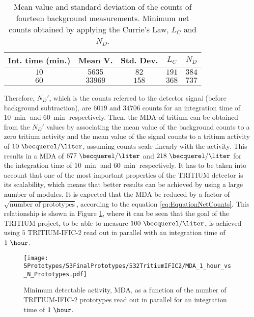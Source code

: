 \begin{table}[htbp]
\centering{}%
\begin{tabular}{ccccc}
\toprule 
Int. time (min.) & Mean V. & Std. Dev. & $L_C$ & $N_D$ \tabularnewline
\midrule
\midrule 
$10$ & $5635$ & $82$ & $191$ & $384$ \tabularnewline
$60$ & $33969$ & $158$ & $368$ & $737$ \tabularnewline
\bottomrule
\end{tabular}
\caption{Mean value and standard deviation of the counts of fourteen background measurements. Minimum net counts obtained by applying the Currie's Law, $L_C$ and $N_D$.}
\label{tab:CurrieLawTRITIUMIFIC2}
\end{table}

Therefore, $N_D'$, which is the counts referred to the detector signal (before background subtraction), are $6019$ and $34706$ counts for an integration time of $10~\min$ and $60~\min$ respectively. Then, the MDA of tritium can be obtained from the $N_D'$ values by associating the mean value of the background counts to a zero tritium activity and the mean value of the signal counts to a tritium activity of $10~\becquerel/\liter$, assuming counts scale linearly with the activity. This results in a MDA of $677~\becquerel/\liter$ and $218~\becquerel/\liter$ for the integration time of $10~\min$ and $60~\min$ respectively. It has to be taken into account that one of the most important properties of the TRITIUM detector is its scalability, which means that better results can be achieved by using a large number of modules. It is expected that the MDA be reduced by a factor of $\sqrt{\text{number of prototypes}}$, according to the equation \ref{eq:EquationNetCounts}. This relationship is shown in Figure \ref{fig:MDATRITIUMmonitor}, where it can be seen that the goal of the TRITIUM project, to be able to measure $100~\becquerel/\liter$, is achieved using $5$ TRITIUM-IFIC-2 read out in parallel with an integration time of $1~\hour$.

\begin{figure}[h]
\centering
\texttt{[image: 5Prototypes/53FinalPrototypes/532TritiumIFIC2/MDA\_1\_hour\_vs\_N\_Prototypes.pdf]}
\caption{Minimum detectable activity, MDA, as a function of the number of TRITIUM-IFIC-2 prototypes read out in parallel for an integration time of $1~\hour$. \label{fig:MDATRITIUMmonitor}}
\end{figure}


